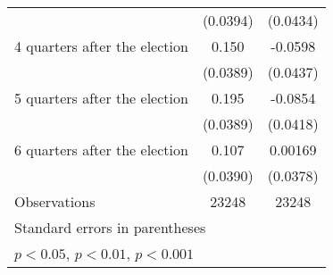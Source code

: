 \begin{table}[htbp]
\begin{tabular}{l*{2}{c}}
                    &    (0.0394)         &    (0.0434)         \\
[1em]
 4 quarters after the election&       0.150\sym{***}&     -0.0598         \\
                    &    (0.0389)         &    (0.0437)         \\
[1em]
 5 quarters after the election&       0.195\sym{***}&     -0.0854\sym{*}  \\
                    &    (0.0389)         &    (0.0418)         \\
[1em]
 6 quarters after the election&       0.107\sym{**} &     0.00169         \\
                    &    (0.0390)         &    (0.0378)         \\
\hline
Observations        &       23248         &       23248         \\
\hline\hline
\multicolumn{3}{l}{\footnotesize Standard errors in parentheses}\\
\multicolumn{3}{l}{\footnotesize \sym{*} \(p<0.05\), \sym{**} \(p<0.01\), \sym{***} \(p<0.001\)}\\
\end{tabular}
\end{table}

